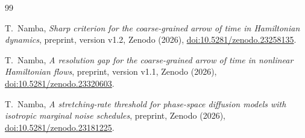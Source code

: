 \begin{thebibliography}{99}

T.~Namba, \textit{Sharp criterion for the coarse-grained arrow of time in Hamiltonian dynamics}, preprint, version v1.2, Zenodo (2026), \href{https://doi.org/10.5281/zenodo.23258135}{doi:10.5281/zenodo.23258135}.

T.~Namba, \textit{A resolution gap for the coarse-grained arrow of time in nonlinear Hamiltonian flows}, preprint, version v1.1, Zenodo (2026), \href{https://doi.org/10.5281/zenodo.23320603}{doi:10.5281/zenodo.23320603}.

T.~Namba, \textit{A stretching-rate threshold for phase-space diffusion models with isotropic marginal noise schedules}, preprint, Zenodo (2026), \href{https://doi.org/10.5281/zenodo.23181225}{doi:10.5281/zenodo.23181225}.

\end{thebibliography}
